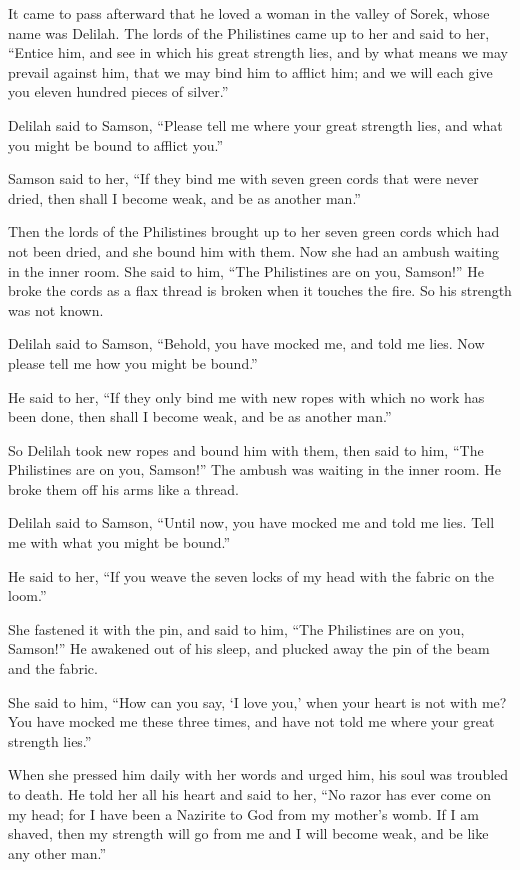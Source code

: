  It came to pass afterward that he loved a woman in the
valley of Sorek, whose name was Delilah.  The lords of the
Philistines came up to her and said to her, ``Entice him, and see in
which his great strength lies, and by what means we may prevail against
him, that we may bind him to afflict him; and we will each give you
eleven hundred pieces of silver.''

 Delilah said to Samson, ``Please tell me where your great
strength lies, and what you might be bound to afflict you.''

 Samson said to her, ``If they bind me with seven green
cords that were never dried, then shall I become weak, and be as another
man.''

 Then the lords of the Philistines brought up to her seven
green cords which had not been dried, and she bound him with them.
 Now she had an ambush waiting in the inner room. She said
to him, ``The Philistines are on you, Samson!'' He broke the cords as a
flax thread is broken when it touches the fire. So his strength was not
known.

 Delilah said to Samson, ``Behold, you have mocked me, and
told me lies. Now please tell me how you might be bound.''

 He said to her, ``If they only bind me with new ropes with
which no work has been done, then shall I become weak, and be as another
man.''

 So Delilah took new ropes and bound him with them, then
said to him, ``The Philistines are on you, Samson!'' The ambush was
waiting in the inner room. He broke them off his arms like a thread.

 Delilah said to Samson, ``Until now, you have mocked me
and told me lies. Tell me with what you might be bound.''

He said to her, ``If you weave the seven locks of my head with the
fabric on the loom.''

 She fastened it with the pin, and said to him, ``The
Philistines are on you, Samson!'' He awakened out of his sleep, and
plucked away the pin of the beam and the fabric.

 She said to him, ``How can you say, `I love you,' when
your heart is not with me? You have mocked me these three times, and
have not told me where your great strength lies.''

 When she pressed him daily with her words and urged him,
his soul was troubled to death.  He told her all his heart
and said to her, ``No razor has ever come on my head; for I have been a
Nazirite to God from my mother's womb. If I am shaved, then my strength
will go from me and I will become weak, and be like any other man.''

